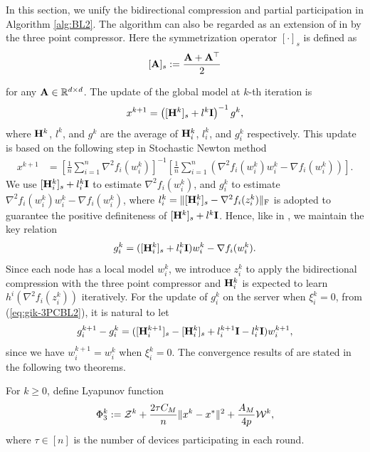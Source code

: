 \documentclass[11pt]{article}
\begin{document}
	
	In this section, we unify the bidirectional compression and partial participation in Algorithm \ref{alg:BL2}. The algorithm can also be regarded as an extension of  in \citep{qian2021basis} by the three point compressor. Here the symmetrization operator $[\cdot]_s$ is defined as
	$$
	[\mathbf{A}]_s \; { := }\; \frac{\mathbf{A} + \mathbf{A}^\top}{2}
	$$
	
	for any $\mathbf{A} \in \mathbb{R}^{d\times d}$. The update of the global model at $k$-th iteration is 
	$$
	x^{k+1} = \left(  [\mathbf{H}^k]_s + l^k\mathbf{I}  \right)^{-1} g^k, 
	$$
	where $\mathbf{H}^k$, $l^k$, and $g^k$ are the average of $\mathbf{H}_i^k$, $l_i^k$, and $g_i^k$ respectively. This update is based on the following step in Stochastic Newton method \citep{SN2019}
	\begin{align*}
		x^{k+1} &= \left[  \tfrac{1}{n} \sum_{i=1}^n \nabla^2 f_i(w_i^k)  \right]^{-1}  \left[  \tfrac{1}{n} \sum_{i=1}^n \left(  \nabla^2 f_i(w_i^k) w_i^k - \nabla f_i(w_i^k)  \right)  \right]. 
	\end{align*}
	We use $[\mathbf{H}_i^k]_s + l_i^k\mathbf{I}$ to estimate $\nabla^2 f_i(w_i^k)$, and $g_i^k$ to estimate $\nabla^2 f_i(w_i^k) w_i^k - \nabla f_i(w_i^k)$, where $l_i^k = \|[\mathbf{H}_i^k]_s-\nabla^2 f_i(z_i^k)\|_{\rm F}$ is adopted to guarantee the positive definiteness of $[\mathbf{H}^k]_s+l^k \mathbf{I}$. Hence, like  in \citep{qian2021basis}, we maintain the key relation 
	\begin{equation}\label{eq:gik-3PCBL2}
		g_i^k = ([\mathbf{H}_i^k]_s + l_i^k\mathbf{I}) w_i^k - \nabla f_i(w_i^k). 
	\end{equation}
	Since each node has a local model $w_i^k$, we introduce $z_i^k$ to apply the bidirectional compression with the three point compressor and $\mathbf{H}_i^k$ is expected to learn $h^i(\nabla^2 f_i(z_i^k))$ iteratively.
	For the update of $g_i^k$ on the server when $\xi_i^k=0$, from (\ref{eq:gik-3PCBL2}), it is natural to let $$g_i^{k+1} - g_i^k = ([\mathbf{H}_i^{k+1}]_s - [\mathbf{H}_i^k]_s + l_i^{k+1}\mathbf{I} - l_i^k\mathbf{I}) w_i^{k+1},$$ since we have $w_i^{k+1} = w_i^k$ when $\xi_i^k=0$. The convergence results of  are stated in the following two theorems. 
	
	
	
	For $k\geq 0$, define Lyapunov function $$\Phi_3^k \; { := }\; {\cal Z}^k + \frac{2\tau C_M}{n} \|x^k-x^*\|^2 + \frac{A_M}{4p} {\cal W}^k,$$ 
	where $\tau\in[n]$ is the number of devices participating in each round. 
	
\end{document}
